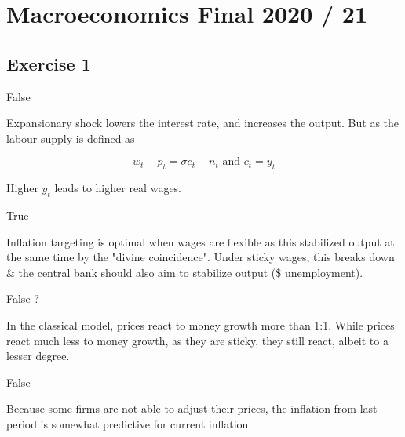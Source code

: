 \section{Macroeconomics Final 2020 / 21}

{
\subsection*{Exercise 1}

\begin{enumerate}[label=(\alph*)]
{\item 
False

Expansionary shock lowers the interest rate, and increases the output. But as the labour supply is defined as

$$
w_{t}-p_{t}=\sigma c_{t}+n_{t} \text{ and } c_{t}=y_{t}
$$

Higher $y_t$ leads to higher real wages.
}
{
\item 
True

Inflation targeting is optimal when wages are flexible as this stabilized output at the same time by the "divine coincidence". Under sticky wages, this breaks down \& the central bank should also aim to stabilize output (\$ unemployment).
}
{
\item 
 False \color{red}?\color{black}

In the classical model, prices react to money growth more than 1:1. 
While prices react much less to money growth, as they are sticky, they still react, albeit to a lesser degree.
}
{
\item 
False

Because some firms are not able to adjust their prices, the inflation from last period is somewhat predictive for current inflation.
}
\end{enumerate}
}
